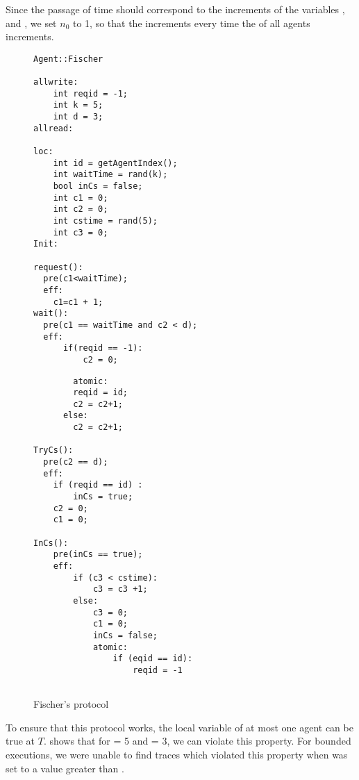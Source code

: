 Since the passage of time should correspond to the increments of the variables , and , we set $n_0$ to 1, so that the  increments every time the  of all agents increments.  
\begin{figure}[ht!]
\label{fig:fish}
\noindent\begin{minipage}{.5\textwidth}

\begin{lstlisting}
Agent::Fischer

allwrite:
	int reqid = -1; 
    int k = 5;
    int d = 3;
allread:

loc:
	int id = getAgentIndex();
	int waitTime = rand(k); 
    bool inCs = false;
    int c1 = 0;
    int c2 = 0;
	int cstime = rand(5);
    int c3 = 0;
Init:

request():
  pre(c1<waitTime);
  eff:
  	c1=c1 + 1;
wait():
  pre(c1 == waitTime and c2 < d);
  eff:
      if(reqid == -1):
          c2 = 0;
 \end{lstlisting}
 \end{minipage}\hfill
\noindent\begin{minipage}{.5\textwidth}

\begin{lstlisting}
 		atomic:
        reqid = id;
        c2 = c2+1;  
      else:
      	c2 = c2+1;

TryCs():
  pre(c2 == d);
  eff:
    if (reqid == id) :
    	inCs = true;
    c2 = 0;
    c1 = 0;

InCs():
	pre(inCs == true);
    eff:
    	if (c3 < cstime):
        	c3 = c3 +1;
        else:
        	c3 = 0;
            c1 = 0;
            inCs = false;
            atomic:
        		if (eqid == id):
                	reqid = -1
   

 \end{lstlisting}
 \end{minipage}\hfill
 \caption{Fischer's  protocol}
 \end{figure}
 To ensure that this protocol works, the local  variable of at most one agent can be true at  $T$.  shows that for  = 5 and  = 3, we can violate this property. For bounded executions, we were unable to find traces which violated this property when  was set to a value greater than . 
 
 
 